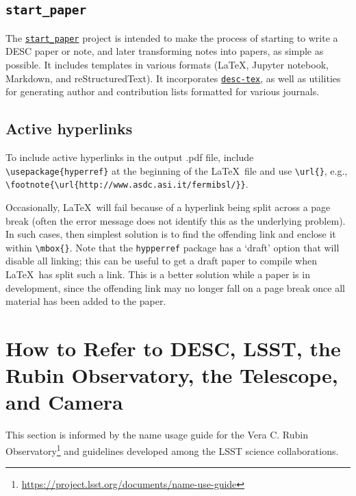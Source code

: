 \documentclass[letterpaper,11pt]{article}
\begin{document}
\subsection{\tt start\_paper}

The \href{https://github.com/LSSTDESC/start_paper}{\tt start\_paper} project is intended to make the process of starting to write a DESC paper or note, and later transforming notes into papers, as simple as possible. It includes templates in various formats (La\TeX, Jupyter notebook, Markdown, and reStructuredText). It incorporates \href{https://github.com/LSSTDESC/desc-tex}{\tt desc-tex}, as well as utilities for generating author and contribution lists formatted for various journals.

\subsection{Active hyperlinks}

To include active hyperlinks in the output .pdf file, include 
\verb|\usepackage{hyperref}| at the beginning of the La\TeX\ file and use
\verb|\url{}|, e.g., \verb|\footnote{\url{http://www.asdc.asi.it/fermibsl/}}|.

Occasionally, La\TeX\ will fail because of a hyperlink being split across
a page break (often the error message does not identify this as the underlying problem). In such cases, then simplest solution is to find the
offending link and enclose it within \verb|\mbox{}|. Note that the {\tt hypperref} package has a `draft' option that will disable all linking; this can be useful to get a draft paper to compile when La\TeX\ has split such a link. This is a better solution while a paper is in development, since the offending link may no longer fall on a page break once all material has been added to the paper.

\section{How to Refer to DESC, LSST, the Rubin Observatory, the Telescope, and Camera} 

This section is informed by the name usage guide for the Vera C. Rubin Observatory\footnote{\url{https://project.lsst.org/documents/name-use-guide}} and guidelines developed among the LSST science collaborations.
\end{document}
